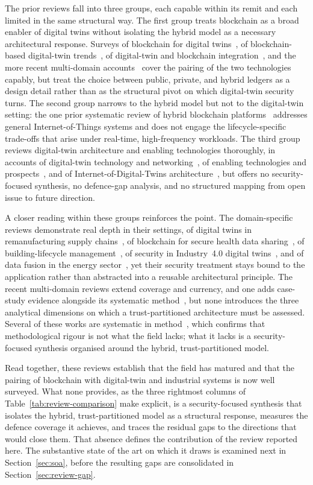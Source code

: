 The prior reviews fall into three groups, each capable within its remit and each
limited in the same structural way. The first group treats blockchain as a broad
enabler of digital twins without isolating the hybrid model as a necessary
architectural response. Surveys of blockchain for digital twins~\cite{yaqoob}, of
blockchain-based digital-twin trends~\cite{sabah}, of digital-twin and blockchain
integration~\cite{hemdan}, and the more recent multi-domain
accounts~\cite{dwivedi, Nexus} cover the pairing of the two technologies capably,
but treat the choice between public, private, and hybrid ledgers as a design
detail rather than as the structural pivot on which digital-twin security turns.
The second group narrows to the hybrid model but not to the digital-twin setting:
the one prior systematic review of hybrid blockchain platforms~\cite{alkhateeb}
addresses general Internet-of-Things systems and does not engage the
lifecycle-specific trade-offs that arise under real-time, high-frequency
workloads. The third group reviews digital-twin architecture and enabling
technologies thoroughly, in accounts of digital-twin technology and
networking~\cite{maggie}, of enabling technologies and prospects~\cite{Mihai},
and of Internet-of-Digital-Twins architecture~\cite{wangbest}, but offers no
security-focused synthesis, no defence-gap analysis, and no structured mapping
from open issue to future direction.

A closer reading within these groups reinforces the point. The domain-specific
reviews demonstrate real depth in their settings, of digital twins in
remanufacturing supply chains~\cite{chen}, of blockchain for secure health data
sharing~\cite{peng, upadrista}, of building-lifecycle management~\cite{adu}, of
security in Industry~4.0 digital twins~\cite{elhajj}, and of data fusion in the
energy sector~\cite{jiang}, yet their security treatment stays bound to the
application rather than abstracted into a reusable architectural principle. The
recent multi-domain reviews extend coverage and currency, and one adds
case-study evidence alongside its systematic method~\cite{christos, Nexus}, but
none introduces the three analytical dimensions on which a trust-partitioned
architecture must be assessed. Several of these works are systematic in
method~\cite{chen, alkhateeb, upadrista, adu, christos, Nexus, elhajj, jiang},
which confirms that methodological rigour is not what the field lacks; what it
lacks is a security-focused synthesis organised around the hybrid,
trust-partitioned model.

Read together, these reviews establish that the field has matured and that the
pairing of blockchain with digital-twin and industrial systems is now well
surveyed. What none provides, as the three rightmost columns of
Table~\ref{tab:review-comparison} make explicit, is a security-focused synthesis
that isolates the hybrid, trust-partitioned model as a structural response,
measures the defence coverage it achieves, and traces the residual gaps to the
directions that would close them. That absence defines the contribution of the
review reported here. The substantive state of the art on which it draws is
examined next in Section~\ref{sec:soa}, before the resulting gaps are
consolidated in Section~\ref{sec:review-gap}.

